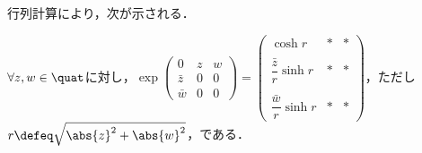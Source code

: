 行列計算により，次が示される．
\begin{lem}\label{lem:exp-quat}
  
  $\forall z,w\in \quat$に対し，$\exp
  \begin{pmatrix}
    0 & z & w  \\
    \bar{z} & 0 & 0\\
    \bar{w} & 0 & 0
  \end{pmatrix}
  =
  \begin{pmatrix}
    \cosh r &  \ast & \ast \\
    \\
    \dfrac{\bar{z}}{r} \sinh r &  \ast & \ast \\
    \\
    \dfrac{\bar{w}}{r}\sinh r &  \ast & \ast 
  \end{pmatrix}
  $，ただし$r \defeq \sqrt{\abs{z}^2 + \abs{w}^2 } $，である．
\end{lem}

